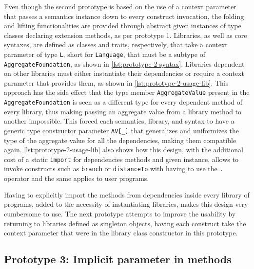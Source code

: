Even though the second prototype is based on the use of a context parameter that passes a semantics instance down to every construct invocation, the folding and lifting functionalities are provided through abstract given instances of type classes declaring extension methods, as per prototype 1.
%
Libraries, as well as core syntaxes, are defined as classes and traits, respectively, that take a context parameter of type \texttt{L}, short for \texttt{Language}, that must be a subtype of \texttt{AggregateFoundation}, as shown in \cref{lst:prototype-2-syntax}.
%
Libraries dependent on other libraries must either instantiate their dependencies or require a context parameter that provides them, as shown in \cref{lst:prototype-2-usage-lib}.
%
This approach has the side effect that the type member \texttt{AggregateValue} present in the \texttt{AggregateFoundation} is seen as a different type for every dependent method of every library, thus making passing an aggregate value from a library method to another impossible.
%
This forced each semantics, library, and syntax to have a generic type constructor parameter \texttt{AV[\_]} that generalizes and uniformizes the type of the aggregate value for all the dependencies, making them compatible again.
%
\cref{lst:prototype-2-usage-lib} also shows how this design, with the additional cost of a static \texttt{import} for dependencies methods and given instance, allows to invoke constructs such as \texttt{branch} or \texttt{distanceTo} with having to use the \texttt{.} operator and the same applies to user programs.




Having to explicitly import the methods from dependencies inside every library of programs, added to the necessity of instantiating libraries, makes this design very cumbersome to use.
%
The next prototype attempts to improve the usability by returning to libraries defined as singleton objects, having each construct take the context parameter that were in the library class constructor in this prototype.


\subsection{Prototype 3: Implicit parameter in methods} \label{chap:design->sec:dsl->subsec:prototype-3-implicit-parameter-in-methods}

